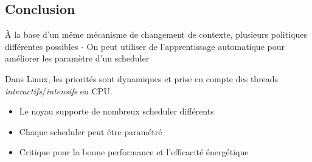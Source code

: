 \subsection{Conclusion}\label{conclusion}

À la base d'un même mécanisme de changement de contexte, plusieurs
politiques différentes possibles - On peut utiliser de l'apprentissage
automatique pour améliorer les paramètre d'un scheduler

Dans Linux, les priorités sont dynamiques et prise en compte des threads
\emph{interactifs}/\emph{intensifs} en CPU.

\begin{itemize}
\tightlist
\item
  Le noyau supporte de nombreux scheduler différents
\item
  Chaque scheduler peut être paramétré
\item
  Critique pour la bonne performance et l'efficacité énergétique
\end{itemize}
